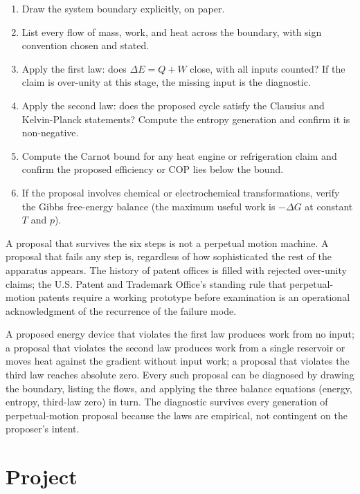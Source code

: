 \begin{enumerate}[leftmargin=*]
  \item Draw the system boundary explicitly, on paper.
  \item List every flow of mass, work, and heat across the boundary,
    with sign convention chosen and stated.
  \item Apply the first law: does $\Delta E = Q + W$ close, with all
    inputs counted? If the claim is over-unity at this stage, the
    missing input is the diagnostic.
  \item Apply the second law: does the proposed cycle satisfy the
    Clausius and Kelvin-Planck statements? Compute the entropy
    generation and confirm it is non-negative.
  \item Compute the Carnot bound for any heat engine or refrigeration
    claim and confirm the proposed efficiency or COP lies below the
    bound.
  \item If the proposal involves chemical or electrochemical
    transformations, verify the Gibbs free-energy balance (the
    maximum useful work is $-\Delta G$ at constant $T$ and $p$).
\end{enumerate}

A proposal that survives the six steps is not a perpetual motion
machine. A proposal that fails any step is, regardless of how
sophisticated the rest of the apparatus appears. The history of
patent offices is filled with rejected over-unity claims; the U.S.
Patent and Trademark Office's standing rule that perpetual-motion
patents require a working prototype before examination is an
operational acknowledgment of the recurrence of the failure mode.

\begin{principle}
A proposed energy device that violates the first law produces work
from no input; a proposal that violates the second law produces work
from a single reservoir or moves heat against the gradient without
input work; a proposal that violates the third law reaches absolute
zero. Every such proposal can be diagnosed by drawing the boundary,
listing the flows, and applying the three balance equations (energy,
entropy, third-law zero) in turn. The diagnostic survives every
generation of perpetual-motion proposal because the laws are
empirical, not contingent on the proposer's intent.
\end{principle}

\section{Project}

